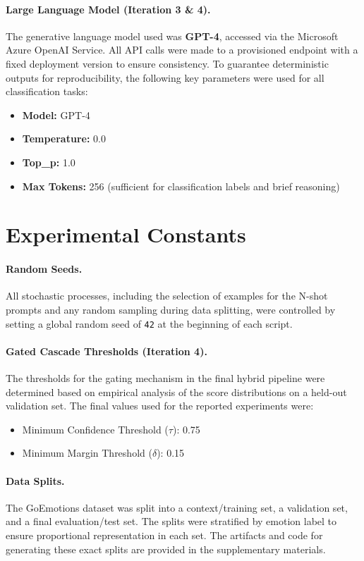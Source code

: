 \paragraph{Large Language Model (Iteration 3 \& 4).}
The generative language model used was \textbf{GPT-4}, accessed via the Microsoft Azure OpenAI Service. All API calls were made to a provisioned endpoint with a fixed deployment version to ensure consistency. To guarantee deterministic outputs for reproducibility, the following key parameters were used for all classification tasks:
\begin{itemize}
    \item \textbf{Model:} GPT-4
    \item \textbf{Temperature:} 0.0
    \item \textbf{Top\_p:} 1.0
    \item \textbf{Max Tokens:} 256 (sufficient for classification labels and brief reasoning)
\end{itemize}

\section{Experimental Constants}

\paragraph{Random Seeds.} All stochastic processes, including the selection of examples for the N-shot prompts and any random sampling during data splitting, were controlled by setting a global random seed of \texttt{42} at the beginning of each script.

\paragraph{Gated Cascade Thresholds (Iteration 4).}
The thresholds for the gating mechanism in the final hybrid pipeline were determined based on empirical analysis of the score distributions on a held-out validation set. The final values used for the reported experiments were:
\begin{itemize}
    \item Minimum Confidence Threshold ($\tau$): 0.75
    \item Minimum Margin Threshold ($\delta$): 0.15
\end{itemize}

\paragraph{Data Splits.}
The GoEmotions dataset was split into a context/training set, a validation set, and a final evaluation/test set. The splits were stratified by emotion label to ensure proportional representation in each set. The artifacts and code for generating these exact splits are provided in the supplementary materials.